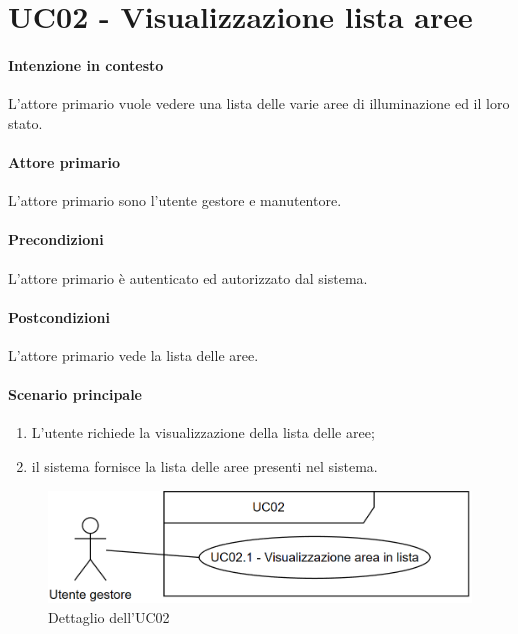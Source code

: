 \section{UC02 - Visualizzazione lista aree}\label{uc:02}

\paragraph{Intenzione in contesto} L'attore primario vuole vedere una lista delle varie aree di illuminazione ed il loro stato.

\paragraph{Attore primario} L'attore primario sono l'utente gestore e manutentore.

\paragraph{Precondizioni} L'attore primario è autenticato ed autorizzato dal sistema.

\paragraph{Postcondizioni} L'attore primario vede la lista delle aree.

\paragraph{Scenario principale}

\begin{enumerate}
    \item L'utente richiede la visualizzazione della lista delle aree;
    \item il sistema fornisce la lista delle aree presenti nel sistema.
\end{enumerate}

\begin{figure}[h]
    \includegraphics[width=\textwidth]{contenuti/img/casi_uso_grafici-uc02.png}
    \caption{Dettaglio dell'UC02}
    \label{fig:uc02}
\end{figure}

